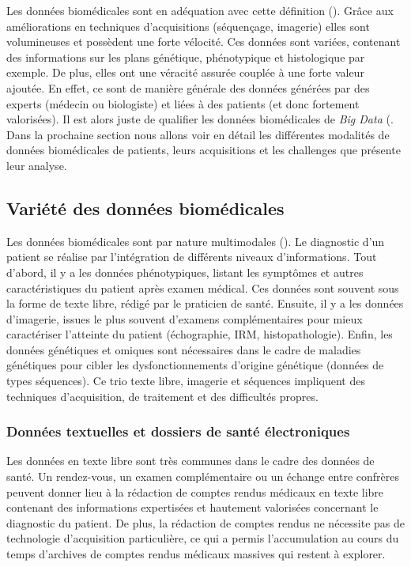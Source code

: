 Les données biomédicales sont en adéquation avec cette définition (\cite{zheng_application_2021}). Grâce aux améliorations en techniques d'acquisitions (séquençage, imagerie) elles sont volumineuses et possèdent une forte vélocité. Ces données sont variées, contenant des informations sur les plans génétique, phénotypique et histologique par exemple. De plus, elles ont une véracité assurée couplée à une forte valeur ajoutée. En effet, ce sont de manière générale des données générées par des experts (médecin ou biologiste) et liées à des patients (et donc fortement valorisées). Il est alors juste de qualifier les données biomédicales de \textit{Big Data} (\cite{sonawane_network_2019}. Dans la prochaine section nous allons voir en détail les différentes modalités de données biomédicales de patients, leurs acquisitions et les challenges que présente leur analyse.

\subsection{Variété des données biomédicales}
Les données biomédicales sont par nature multimodales (\cite{acosta_multimodal_2022}). Le diagnostic d'un patient se réalise par l'intégration de différents niveaux d'informations. Tout d'abord, il y a les données phénotypiques, listant les symptômes et autres caractéristiques du patient après examen médical. Ces données sont souvent sous la forme de texte libre, rédigé par le praticien de santé. Ensuite, il y a les données d'imagerie, issues le plus souvent d'examens complémentaires pour mieux caractériser l'atteinte du patient (échographie, IRM, histopathologie). Enfin, les données génétiques et omiques sont nécessaires dans le cadre de maladies génétiques pour cibler les dysfonctionnements d'origine génétique (données de types séquences). Ce trio texte libre, imagerie et séquences impliquent des techniques d'acquisition, de traitement et des difficultés propres.

\subsubsection{Données textuelles et dossiers de santé électroniques}
Les données en texte libre sont très communes dans le cadre des données de santé. Un rendez-vous, un examen complémentaire ou un échange entre confrères peuvent donner lieu à la rédaction de comptes rendus médicaux en texte libre contenant des informations expertisées et hautement valorisées concernant le diagnostic du patient. De plus, la rédaction de comptes rendus ne nécessite pas de technologie d'acquisition particulière, ce qui a permis l'accumulation au cours du temps d'archives de comptes rendus médicaux massives qui restent à explorer.

